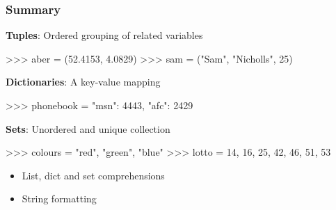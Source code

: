 \documentclass{beamer}
\begin{document}










\begin{frame}[fragile]
\frametitle{Summary}
\textbf{Tuples}: Ordered grouping of related variables
\begin{code}
>>> aber = (52.4153, 4.0829)
>>> sam = ("Sam", "Nicholls", 25)
\end{code}

\vskip 0.2cm
\textbf{Dictionaries}: A key-value mapping
\begin{code}
>>> phonebook = {"msn": 4443, "afc": 2429}
\end{code}

\vskip 0.2cm
\textbf{Sets}: Unordered and unique collection
\begin{code}
>>> colours = {"red", "green", "blue"}
>>> lotto = {14, 16, 25, 42, 46, 51, 53}
\end{code}

\begin{itemize}
    \item List, dict and set comprehensions
    \item String formatting
\end{itemize}
\end{frame}
\end{document}
